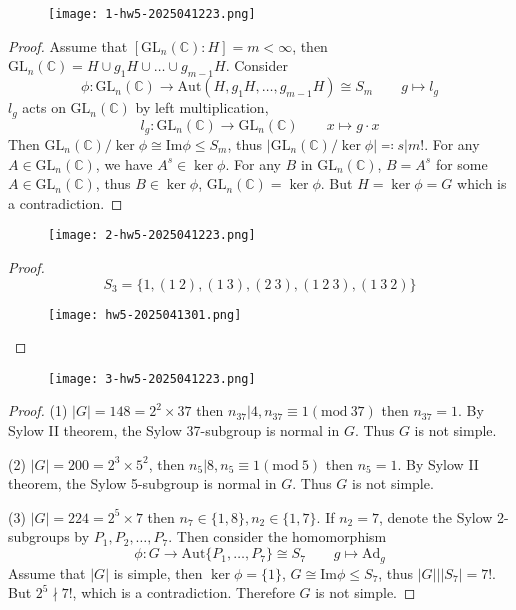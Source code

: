 \begin{figure}[H]
\centering
\texttt{[image: 1-hw5-2025041223.png]}
\label{}
\end{figure}
\begin{proof}
Assume that $[\mathrm{GL}_n(\mathbb{C}):H]=m<\infty$, then $\mathrm{GL}_n(\mathbb{C})=H\cup g_1H\cup\dots \cup g_{m-1}H$. Consider
\[
\phi:\mathrm{GL}_n(\mathbb{C})\to \mathrm{Aut}(H,g_1H,\dots,g_{m-1}H)\cong S_m \qquad g\mapsto l_{g}
\]
$l_{g}$ acts on $\mathrm{GL}_n(\mathbb{C})$ by left multiplication,
\[
l_{g}:\mathrm{GL}_n(\mathbb{C})\to \mathrm{GL}_n(\mathbb{C})\qquad x\mapsto g\cdot x
\]
Then $\mathrm{GL}_n(\mathbb{C})/\ker \phi \cong \mathrm{Im}\phi \leq S_m$, thus $\lvert \mathrm{GL}_n(\mathbb{C})/\ker \phi \rvert\eqqcolon s|m!$. For any $A\in \mathrm{GL}_n(\mathbb{C})$, we have $A^{s}\in \ker \phi$. For any $B$ in $\mathrm{GL}_n(\mathbb{C})$, $B=A^{s}$ for some $A\in \mathrm{GL}_n(\mathbb{C})$, thus $B\in \ker \phi$, $\mathrm{GL}_n(\mathbb{C})=\ker \phi$. But $H=\ker \phi=G$ which is a contradiction.
\end{proof}
\begin{figure}[H]
\centering
\texttt{[image: 2-hw5-2025041223.png]}
\label{}
\end{figure}
\begin{proof}
\[
S_3=\{ 1,(1\ 2),(1\ 3),(2\ 3),(1\ 2\ 3),(1\ 3\ 2) \}
\]
\begin{figure}[H]
\centering
\texttt{[image: hw5-2025041301.png]}
\label{}
\end{figure}
\end{proof}

\begin{figure}[H]
\centering
\texttt{[image: 3-hw5-2025041223.png]}
\label{}
\end{figure}

\begin{proof}
(1) $\lvert G \rvert=148=2^2\times37$ then $n_{37}|4, n_{37}\equiv1(\mathrm{mod} \ 37)$ then $n_{37}=1$. By Sylow II theorem, the Sylow 37-subgroup is normal in $G$. Thus $G$ is not simple.

(2) $\lvert G \rvert=200=2^{3}\times5^2$, then $n_5|8,n_5\equiv1(\mathrm{mod}\ 5)$ then $n_5=1$. By Sylow II theorem, the Sylow 5-subgroup is normal in $G$. Thus $G$ is not simple.

(3) $\lvert G \rvert=224=2^{5}\times7$ then $n_7\in \{ 1,8 \}, n_2\in \{ 1,7 \}$. If $n_2=7$, denote the Sylow 2-subgroups by $P_1,P_2,\dots,P_7$. Then consider the homomorphism
\[
\phi:G\to \mathrm{Aut}\{ P_1,\dots,P_7 \}\cong S_7\qquad g\mapsto \mathrm{Ad}_{g}
\]
Assume that $\lvert G \rvert$ is simple, then $\ker \phi=\{ 1 \}$, $G\cong \mathrm{Im}\phi\leq S_7$, thus $\lvert G \rvert|\lvert S_7 \rvert=7!$. But $2^{5}\nmid 7!$, which is a contradiction. Therefore $G$ is not simple.
\end{proof}

